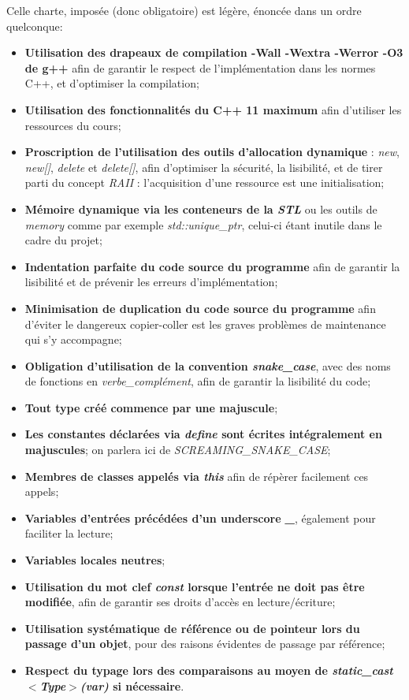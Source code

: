\documentclass[9pts]{article}
\begin{document}
Celle charte, imposée (donc obligatoire) est légère, énoncée dans un ordre quelconque:
\begin{itemize}
\item \textbf{Utilisation des drapeaux de compilation -Wall -Wextra -Werror -O3 de g++} afin de garantir le respect de l'implémentation dans les normes C++, et d'optimiser la compilation;
\item \textbf{Utilisation des fonctionnalités du C++ 11 maximum} afin d'utiliser les ressources du cours; %
\item \textbf{Proscription de l'utilisation des outils d'allocation dynamique} : \emph{new}, \emph{new[]}, \emph{delete} et \emph{delete[]}, afin d'optimiser la sécurité, la lisibilité, et de tirer parti du concept \emph{RAII} : l'acquisition d'une ressource est une initialisation;
\item \textbf{Mémoire dynamique via les conteneurs de la \emph{STL}} ou les outils de \emph{memory} comme par exemple \emph{std::unique\_ptr}, celui-ci étant inutile dans le cadre du projet;
\item \textbf{Indentation parfaite du code source du programme} afin de garantir la lisibilité et de prévenir les erreurs d'implémentation;
\item \textbf{Minimisation de duplication du code source du programme} afin d'éviter le dangereux copier-coller est les graves problèmes de maintenance qui s'y accompagne;
\item \textbf{Obligation d'utilisation de la convention \emph{snake\_case}}, avec des noms de fonctions en \emph{verbe\_complément}, afin de garantir la lisibilité du code;
\item \textbf{Tout type créé commence par une majuscule}; %
\item \textbf{Les constantes déclarées via \emph{define} sont écrites intégralement en majuscules}; on parlera ici de \emph{SCREAMING\_SNAKE\_CASE};
\item \textbf{Membres de classes appelés via \emph{this}} afin de répèrer facilement ces appels;
\item \textbf{Variables d'entrées précédées d'un underscore \emph{\_}}, également pour faciliter la lecture;
\item \textbf{Variables locales neutres}; %
\item \textbf{Utilisation du mot clef \emph{const} lorsque l'entrée ne doit pas être modifiée}, afin de garantir ses droits d'accès en lecture/écriture;
\item \textbf{Utilisation systématique de référence ou de pointeur lors du passage d'un objet}, pour des raisons évidentes de passage par référence;
\item \textbf{Respect du typage lors des comparaisons au moyen de \emph{static\_cast$<$Type$>$(var)} si nécessaire}.
\end{itemize}
\end{document}
